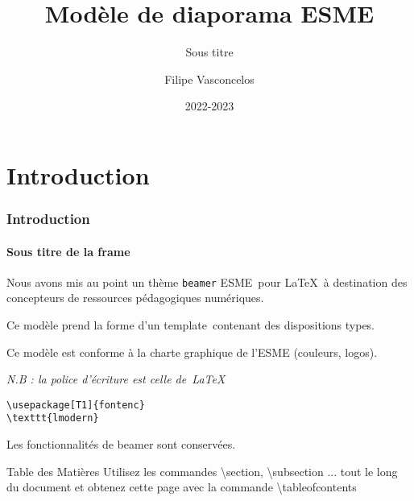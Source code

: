 \documentclass[aspectratio=169]{beamer}
\title{Modèle de diaporama ESME}
\subtitle{Sous titre}
\author{Filipe Vasconcelos\inst{1}}
\institute{
    \inst{1} ESME Sudria, Lille, \textcolor{blue}{\texttt{filipe.vasconcelo@esme.fr}}
}
\date{2022-2023}
\begin{document}
\begin{frame}
\titlepage
\end{frame}

\section{Introduction}

\begin{frame}[fragile] 
\frametitle{Introduction} 
\framesubtitle{Sous titre de la frame} 

Nous avons mis au point un thème \texttt{beamer} \og ESME\fg~pour 
\LaTeX~à destination des concepteurs de ressources pédagogiques 
numériques.\newline

Ce modèle prend la forme d'un \og template\fg~contenant des 
dispositions types.\newline

Ce modèle est conforme à la charte graphique de l'ESME (couleurs, 
logos).

\emph{N.B : la police d'écriture est celle de~\LaTeX}\newline

\begin{verbatim}
\usepackage[T1]{fontenc}
\texttt{lmodern}
\end{verbatim}

Les fonctionnalités de beamer sont conservées.
\end{frame}

\begin{frame}{Table des Matières}
    \tableofcontents
    \scriptsize
    Utilisez les commandes \textbackslash section, \textbackslash subsection ...
    tout le long du document et obtenez cette page avec la commande 
    \textbackslash tableofcontents
\end{frame}
\end{document}
